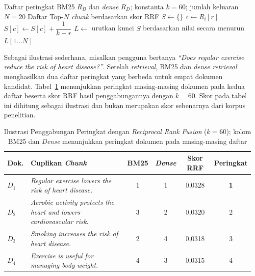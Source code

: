 \begin{algorithm}[H]
\caption{Penggabungan Peringkat dengan \textit{Reciprocal Rank Fusion} (RRF)}
\label{alg:rrf}
\begin{algorithmic}[1]
\Require Daftar peringkat BM25 $R_B$ dan \textit{dense} $R_D$; konstanta $k = 60$; jumlah keluaran $N = 20$
\Ensure Daftar Top-$N$ \textit{chunk} berdasarkan skor RRF
\State $S \gets \{\}$ 
    \State $c \gets R_i[r]$ 
    \State $S[c] \gets S[c] + \dfrac{1}{k + r}$ 
  \EndFor
\EndFor
\State $L \gets$ urutkan kunci $S$ berdasarkan nilai secara menurun
\State \Return $L[1 \ldots N]$
\end{algorithmic}
\end{algorithm}

Sebagai ilustrasi sederhana, misalkan pengguna bertanya \textit{``Does regular exercise reduce the risk of heart disease?''}. Setelah \textit{retrieval}, BM25 dan \textit{dense retrieval} menghasilkan dua daftar peringkat yang berbeda untuk empat dokumen kandidat. Tabel~\ref{tbl:rrf-contoh} menunjukkan peringkat masing-masing dokumen pada kedua daftar beserta skor RRF hasil penggabungannya dengan $k = 60$. Skor pada tabel ini dihitung sebagai ilustrasi dan bukan merupakan skor sebenarnya dari korpus penelitian.

\begin{table}[H]
\centering
\footnotesize
\setlength{\tabcolsep}{4pt}
\caption{Ilustrasi Penggabungan Peringkat dengan \textit{Reciprocal Rank Fusion} ($k = 60$); kolom BM25 dan \textit{Dense} menunjukkan peringkat dokumen pada masing-masing daftar}
\label{tbl:rrf-contoh}
\begin{tabular}{p{0.7cm} p{4.8cm} c c c c}
\toprule
\textbf{Dok.} & \textbf{Cuplikan \textit{Chunk}} & \textbf{BM25} & \textbf{\textit{Dense}} & \textbf{Skor RRF} & \textbf{Peringkat} \\
\midrule
$D_1$ & \textit{Regular exercise lowers the risk of heart disease.} & 1 & 1 & 0{,}0328 & \textbf{1} \\
\addlinespace
$D_2$ & \textit{Aerobic activity protects the heart and lowers cardiovascular risk.} & 3 & 2 & 0{,}0320 & 2 \\
\addlinespace
$D_3$ & \textit{Smoking increases the risk of heart disease.} & 2 & 4 & 0{,}0318 & 3 \\
\addlinespace
$D_4$ & \textit{Exercise is useful for managing body weight.} & 4 & 3 & 0{,}0315 & 4 \\
\bottomrule
\end{tabular}
\end{table}

